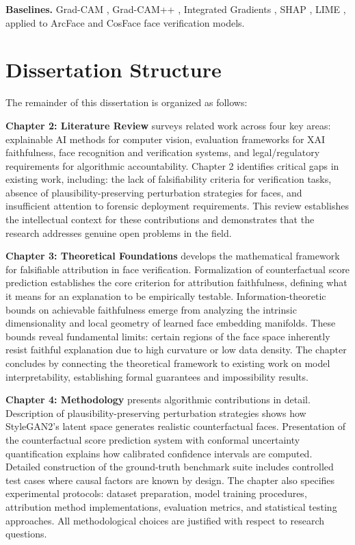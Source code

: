 \textbf{Baselines.} Grad-CAM \cite{selvaraju2019gradcam}, Grad-CAM++ \cite{chattopadhyay2018gradcampp}, Integrated Gradients \cite{Sundararajan2017_IG}, SHAP \cite{lundberg2017unified}, LIME \cite{ribeiro2016lime}, applied to ArcFace \cite{deng2019arcface} and CosFace \cite{wang2018cosface} face verification models.

\section{Dissertation Structure}
\label{sec:structure}

The remainder of this dissertation is organized as follows:

\textbf{Chapter 2: Literature Review} surveys related work across four key areas: explainable AI methods for computer vision, evaluation frameworks for XAI faithfulness, face recognition and verification systems, and legal/regulatory requirements for algorithmic accountability. Chapter 2 identifies critical gaps in existing work, including: the lack of falsifiability criteria for verification tasks, absence of plausibility-preserving perturbation strategies for faces, and insufficient attention to forensic deployment requirements. This review establishes the intellectual context for these contributions and demonstrates that the research addresses genuine open problems in the field.

\textbf{Chapter 3: Theoretical Foundations} develops the mathematical framework for falsifiable attribution in face verification. Formalization of counterfactual score prediction establishes the core criterion for attribution faithfulness, defining what it means for an explanation to be empirically testable. Information-theoretic bounds on achievable faithfulness emerge from analyzing the intrinsic dimensionality and local geometry of learned face embedding manifolds. These bounds reveal fundamental limits: certain regions of the face space inherently resist faithful explanation due to high curvature or low data density. The chapter concludes by connecting the theoretical framework to existing work on model interpretability, establishing formal guarantees and impossibility results.

\textbf{Chapter 4: Methodology} presents algorithmic contributions in detail. Description of plausibility-preserving perturbation strategies shows how StyleGAN2's latent space generates realistic counterfactual faces. Presentation of the counterfactual score prediction system with conformal uncertainty quantification explains how calibrated confidence intervals are computed. Detailed construction of the ground-truth benchmark suite includes controlled test cases where causal factors are known by design. The chapter also specifies experimental protocols: dataset preparation, model training procedures, attribution method implementations, evaluation metrics, and statistical testing approaches. All methodological choices are justified with respect to research questions.

